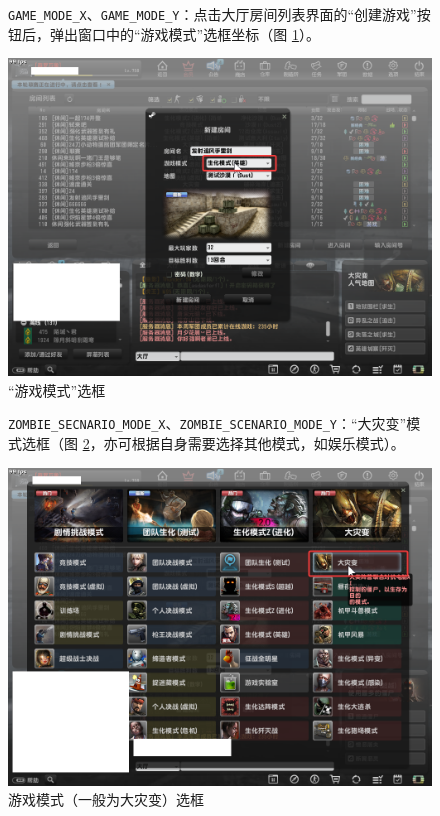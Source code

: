 \begin{figure}[H]
    \Centering
    \parbox[l]{\textwidth}{\lstinline{GAME_MODE_X}、\lstinline{GAME_MODE_Y}：点击大厅房间列表界面的“创建游戏”按钮后，弹出窗口中的“游戏模式”选框坐标（图 \ref{ch2fig-game-mode}）。}
    \includegraphics[width=\textwidth]{docs/assets/game_mode.png}
    \caption{“游戏模式”选框}
    \label{ch2fig-game-mode}
\end{figure}
\clearpage

\begin{figure}[H]
    \Centering
    \parbox[l]{\textwidth}{\lstinline{ZOMBIE_SECNARIO_MODE_X}、\lstinline{ZOMBIE_SCENARIO_MODE_Y}：“大灾变”模式选框（图 \ref{ch2fig-zombie-scenario}，亦可根据自身需要选择其他模式，如娱乐模式）。}
    \includegraphics[width=\textwidth]{docs/assets/zombie_scenario.png}
    \caption{游戏模式（一般为大灾变）选框}
    \label{ch2fig-zombie-scenario}
\end{figure}
\clearpage


